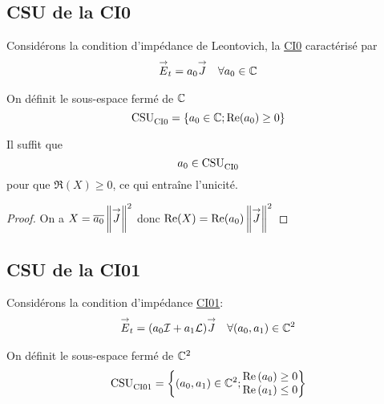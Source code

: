   \subsection{CSU de la CI0}
    Considérons la condition d’impédance de Leontovich, la \hyperlink{ci0}{CI0} caractérisé par
    \begin{align}
      \label{eq:unicite:ci0}
      {\overset{\rightarrow}{E}}_t = a_0 {\overset{\rightarrow}{J}} && \forall a_0 \in \mathbb C
    \end{align}

    \begin{defn}
      \label{def:csu:ci0}
      On définit le sous-espace fermé de \(\mathbb C\)
      \begin{equation*}
        \operatorname{CSU}_{\operatorname{CI0}}^{{}} = \lbrace a_0 \in \mathbb C; \operatorname{Re}(a_0) \ge 0 \rbrace
      \end{equation*}
    \end{defn}

    \begin{prop}
      \label{prop:csu:ci0}
      Il suffit que
      \begin{equation*}
        a_0 \in \operatorname{CSU}_{\operatorname{CI0}}^{{}}
      \end{equation*}
      pour que \(\Re(X)\ge 0\), ce qui entraîne l'unicité.
    \end{prop}
    \begin{proof}
      On a \( X = {\overline{a_0}}\left\lVert{\overset{\rightarrow}{J}}\right\rVert^2\) donc \(\operatorname{Re}(X) = \operatorname{Re}(a_0)\left\lVert{\overset{\rightarrow}{J}}\right\rVert^2 \)
    \end{proof}
  \subsection{CSU de la CI01}
    Considérons la condition d’impédance \hyperlink{ci01}{CI01}:
    \begin{align}
      \label{eq:unicite:ci01}
      {\overset{\rightarrow}{E}}_t = (a_0{\mathcal{I}} + a_1 \mathcal{L}){\overset{\rightarrow}{J}} && \forall (a_0, a_1) \in \mathbb C^2
    \end{align}

    \begin{defn}
      \label{def:csu:ci01}
      On définit le sous-espace fermé de \(\mathbb C^2\)
      \begin{equation*}
        \operatorname{CSU}_{\operatorname{CI01}}^{{}} = \left\lbrace (a_0,a_1) \in \mathbb C^2; \begin{matrix}
        \operatorname{Re}\left(a_0\right) \ge 0
        \\
        \operatorname{Re}\left(a_1\right) \le 0
        \end{matrix}
        \right\rbrace
      \end{equation*}
    \end{defn}

